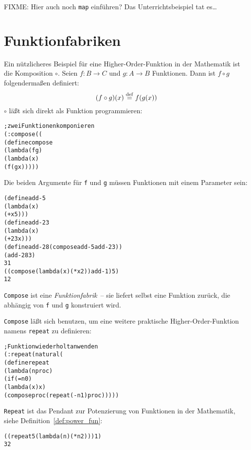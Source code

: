 FIXME: Hier auch noch \texttt{map} einführen? Das Unterrichtsbeispiel tat
es\ldots

\section{Funktionfabriken}

Ein nützlicheres Beispiel für eine Higher-Order-Funktion in der
Mathematik ist die
Komposition
$\circ$.  Seien $f: B\rightarrow C$ und $g: A\rightarrow B$
Funktionen.  Dann ist $f\circ g$ folgendermaßen definiert:
%
\begin{displaymath}
  (f \circ g)(x) \stackrel{\rm def}{=}{} f(g(x))
\end{displaymath}
%
$\circ$ läßt sich direkt als Funktion
programmieren:
\label{page:compose}
%
\begin{alltt}
; zwei Funktionen komponieren
(: compose ((%b -> %c) (%a -> %b) -> (%a -> %c)))
(define compose
  (lambda (f g)
    (lambda (x)
      (f (g x)))))
\end{alltt}
%
Die beiden Argumente für \texttt{f} und \texttt{g} müssen Funktionen
mit einem Parameter sein:
%
\begin{alltt}
(define add-5
  (lambda (x)
    (+ x 5)))
(define add-23
  (lambda (x)
    (+ 23 x)))
(define add-28 (compose add-5 add-23))
(add-28 3)
\evalsto{} 31
((compose (lambda (x) (* x 2)) add-1) 5)
\evalsto{} 12
\end{alltt}
%
\texttt{Compose} ist eine
\textit{Funktionfabrik}~-- sie liefert selbst
eine Funktion zurück, die abhängig von \texttt{f} und \texttt{g}
konstruiert wird.

\texttt{Compose} läßt sich benutzen, um eine weitere praktische
Higher-Order-Funktion namens
\texttt{repeat} zu definieren:
\label{page:repeat}
%
\begin{alltt}
; Funktion wiederholt anwenden
(: repeat (natural (%a -> %a) -> (%a -> %a)))
(define repeat
  (lambda (n proc)
    (if (= n 0)
        (lambda (x) x)
        (compose proc (repeat (- n 1) proc)))))
\end{alltt}
%
\texttt{Repeat} ist das Pendant zur Potenzierung von
Funktionen in der Mathematik, siehe Definition~\ref{def:power_fun}:
%
\begin{alltt}
((repeat 5 (lambda (n) (* n 2))) 1)
\evalsto{} 32
\end{alltt}

